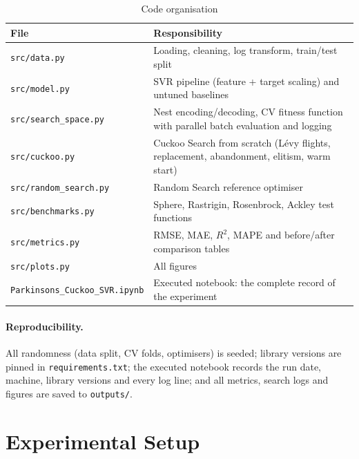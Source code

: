 \documentclass[12pt,a4paper]{article}
\numberwithin{equation}{section}
\numberwithin{table}{section}
\numberwithin{figure}{section}
\begin{document}
\begin{table}[H]
\centering
\caption{Code organisation}
\label{tab:code}
\small
\renewcommand{\arraystretch}{1.15}
\begin{tabularx}{\textwidth}{@{}l>{\raggedright\arraybackslash}X@{}}
\toprule
\textbf{File} & \textbf{Responsibility} \\ \midrule
\texttt{src/data.py} & Loading, cleaning, log transform, train/test split \\
\texttt{src/model.py} & SVR pipeline (feature + target scaling) and untuned baselines \\
\texttt{src/search\_space.py} & Nest encoding/decoding, CV fitness function with parallel batch evaluation and logging \\
\texttt{src/cuckoo.py} & Cuckoo Search from scratch (Lévy flights, replacement, abandonment, elitism, warm start) \\
\texttt{src/random\_search.py} & Random Search reference optimiser \\
\texttt{src/benchmarks.py} & Sphere, Rastrigin, Rosenbrock, Ackley test functions \\
\texttt{src/metrics.py} & RMSE, MAE, $R^2$, MAPE and before/after comparison tables \\
\texttt{src/plots.py} & All figures \\
\texttt{Parkinsons\_Cuckoo\_SVR.ipynb} & Executed notebook: the complete record of the experiment \\ \bottomrule
\end{tabularx}
\end{table}

\paragraph{Reproducibility.} All randomness (data split, CV folds, optimisers) is seeded; library versions are pinned in \texttt{requirements.txt}; the executed notebook records the run date, machine, library versions and every log line; and all metrics, search logs and figures are saved to \texttt{outputs/}.

\section{Experimental Setup}\label{sec:setup}
\end{document}
